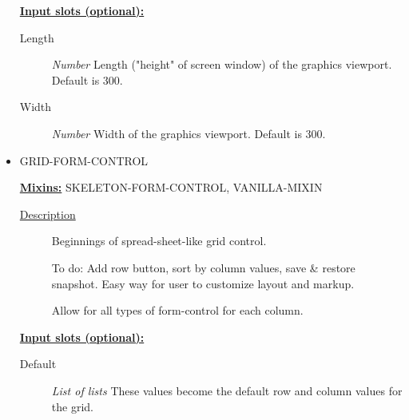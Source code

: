 \documentclass [11pt]{book}
\begin{document}
\begin{itemize}
\begin{description}

\end{description}








\textbf{
\underline{Input slots (optional):}}

\begin{description}

\item [Length]
\emph{Number} Length ("height" of screen window) of the graphics viewport. Default is 300.


\item [Width]
\emph{Number} Width of the graphics viewport. Default is 300.


\end{description}







\item {}GRID-FORM-CONTROL


\textbf{
\underline{Mixins:}} SKELETON-FORM-CONTROL, VANILLA-MIXIN





\begin{description}

\item [
\underline{Description}]


Beginnings of spread-sheet-like 
grid control.

To do: Add row button, sort by column values, 
save & restore snapshot. Easy way for user to 
customize layout and markup.

Allow for all types of form-control for each column.





\end{description}








\textbf{
\underline{Input slots (optional):}}

\begin{description}

\item [Default]
\emph{List of lists} These values become the default row and column
values for the grid.



\end{description}
\end{itemize}
\end{document}

